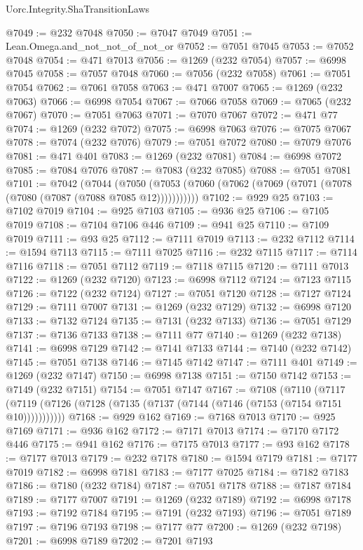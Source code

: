 \begin{lexlean}{Uorc.Integrity.ShaTransitionLaws}
\begin{coremodule}
@7049 := @232 @7048
@7050 := @7047 @7049
@7051 := Lean.Omega.and_not_not_of_not_or
@7052 := @7051 @7045
@7053 := @7052 @7048
@7054 := @471 @7013
@7056 := @1269 (@232 @7054)
@7057 := @6998 @7045
@7058 := @7057 @7048
@7060 := @7056 (@232 @7058)
@7061 := @7051 @7054
@7062 := @7061 @7058
@7063 := @471 @7007
@7065 := @1269 (@232 @7063)
@7066 := @6998 @7054
@7067 := @7066 @7058
@7069 := @7065 (@232 @7067)
@7070 := @7051 @7063
@7071 := @7070 @7067
@7072 := @471 @77
@7074 := @1269 (@232 @7072)
@7075 := @6998 @7063
@7076 := @7075 @7067
@7078 := @7074 (@232 @7076)
@7079 := @7051 @7072
@7080 := @7079 @7076
@7081 := @471 @401
@7083 := @1269 (@232 @7081)
@7084 := @6998 @7072
@7085 := @7084 @7076
@7087 := @7083 (@232 @7085)
@7088 := @7051 @7081
@7101 := @7042
    (@7044
      (@7050 (@7053 (@7060 (@7062 (@7069 (@7071 (@7078 (@7080 (@7087 (@7088 @7085 @12)))))))))))
@7102 := @929 @25
@7103 := @7102 @7019
@7104 := @925 @7103
@7105 := @936 @25
@7106 := @7105 @7019
@7108 := @7104 @7106 @446
@7109 := @941 @25
@7110 := @7109 @7019
@7111 := @93 @25
@7112 := @7111 @7019
@7113 := @232 @7112
@7114 := @1594 @7113
@7115 := @7111 @7025
@7116 := @232 @7115
@7117 := @7114 @7116
@7118 := @7051 @7112
@7119 := @7118 @7115
@7120 := @7111 @7013
@7122 := @1269 (@232 @7120)
@7123 := @6998 @7112
@7124 := @7123 @7115
@7126 := @7122 (@232 @7124)
@7127 := @7051 @7120
@7128 := @7127 @7124
@7129 := @7111 @7007
@7131 := @1269 (@232 @7129)
@7132 := @6998 @7120
@7133 := @7132 @7124
@7135 := @7131 (@232 @7133)
@7136 := @7051 @7129
@7137 := @7136 @7133
@7138 := @7111 @77
@7140 := @1269 (@232 @7138)
@7141 := @6998 @7129
@7142 := @7141 @7133
@7144 := @7140 (@232 @7142)
@7145 := @7051 @7138
@7146 := @7145 @7142
@7147 := @7111 @401
@7149 := @1269 (@232 @7147)
@7150 := @6998 @7138
@7151 := @7150 @7142
@7153 := @7149 (@232 @7151)
@7154 := @7051 @7147
@7167 := @7108
    (@7110
      (@7117 (@7119 (@7126 (@7128 (@7135 (@7137 (@7144 (@7146 (@7153 (@7154 @7151 @10)))))))))))
@7168 := @929 @162
@7169 := @7168 @7013
@7170 := @925 @7169
@7171 := @936 @162
@7172 := @7171 @7013
@7174 := @7170 @7172 @446
@7175 := @941 @162
@7176 := @7175 @7013
@7177 := @93 @162
@7178 := @7177 @7013
@7179 := @232 @7178
@7180 := @1594 @7179
@7181 := @7177 @7019
@7182 := @6998 @7181
@7183 := @7177 @7025
@7184 := @7182 @7183
@7186 := @7180 (@232 @7184)
@7187 := @7051 @7178
@7188 := @7187 @7184
@7189 := @7177 @7007
@7191 := @1269 (@232 @7189)
@7192 := @6998 @7178
@7193 := @7192 @7184
@7195 := @7191 (@232 @7193)
@7196 := @7051 @7189
@7197 := @7196 @7193
@7198 := @7177 @77
@7200 := @1269 (@232 @7198)
@7201 := @6998 @7189
@7202 := @7201 @7193

\end{coremodule}
\end{lexlean}
